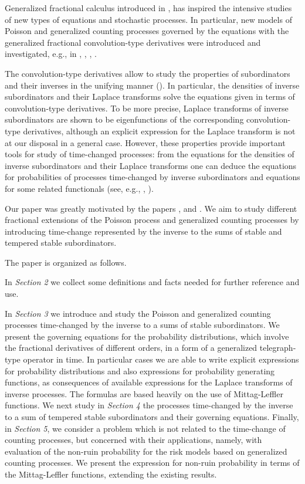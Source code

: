 \documentclass[12pt]{article}
\theoremstyle{definition}
\theoremstyle{plain}
\begin{document}
Generalized fractional calculus introduced in \cite{K}, \cite{T} has inspired the intensive studies of new types of equations and stochastic processes. In particular, new models of Poisson and generalized counting processes governed by the equations with the generalized fractional convolution-type derivatives  were introduced and investigated,  e.g., in \cite{BS2019}, \cite{BS2024}, \cite{KK2022a}, \cite{KK2022Arxiv}.

The convolution-type derivatives allow to study  the properties of subordinators and their inverses in the unifying manner (\cite{T, MT}). In particular,  the densities of inverse subordinators and their Laplace transforms solve the equations  given in terms of   convolution-type derivatives. To be  more precise, Laplace transforms of inverse subordinators are shown to be eigenfunctions of the corresponding  convolution-type derivatives, although an explicit expression for the Laplace transform is not at our disposal in a general case. However,  these properties provide important tools for study of time-changed processes:  from the equations for the densities of inverse subordinators and their Laplace transforms one can deduce the  equations for probabilities of  processes time-changed by inverse subordinators and equations for some related functionals (see, e.g., \cite{BS2019}, \cite{BS2024}). 

Our paper was greatly motivated  by the papers \cite{OT2017}, \cite{DovOrsToaldo} and \cite{BO2010}. We aim to study different fractional extensions of the Poisson process and generalized counting processes by introducing time-change represented by the inverse to the sums of stable and tempered stable subordinators.

The paper is organized as follows. 

In {\it Section 2} we collect some definitions and facts needed for further reference and use.

 In {\it Section 3} we introduce and study the Poisson and generalized counting processes time-changed by the inverse to a sums of stable subordinators. We  present the governing equations for the probability distributions, which  involve the fractional derivatives of different orders, in a form of a generalized telegraph-type operator in time. In particular cases we are able to write explicit expressions for probability distributions and also expressions for probability generating functions, as consequences of available expressions for the Laplace transforms of inverse processes. The formulas are based heavily on the use of Mittag-Leffler functions.  We next study in {\it Section 4} the processes time-changed by the inverse to a sum of tempered stable subordinators and their governing equations. Finally, in {\it Section 5},  we consider a problem which is not related to the time-change of counting processes, but concerned with their applications, namely, with evaluation of the non-ruin probability for the risk models based on generalized counting processes. We present the expression for non-ruin probability in terms of the Mittag-Leffler functions, extending the existing results.        
\end{document}
